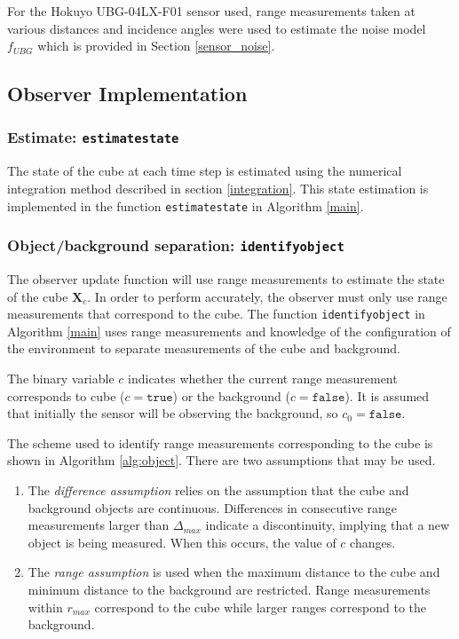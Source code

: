 	For the Hokuyo UBG-04LX-F01 sensor used, range measurements taken at various distances and incidence angles were used to estimate the noise model $f_{UBG}$ which is provided in Section \ref{sensor_noise}.
	
\subsection{Observer Implementation}

	\subsubsection{Estimate: \texttt{estimatestate}}
		The state of the cube at each time step is estimated using the numerical integration method described in section \ref{integration}. This state estimation is implemented in the function \texttt{estimatestate} in Algorithm \ref{main}.
	
	\subsubsection{Object/background separation: \texttt{identifyobject}} \label{separation}
		The observer update function will use range measurements to estimate the state of the cube $\mathbf{X}_c$. In order to perform accurately, the observer must only use range measurements that correspond to the cube. The function \texttt{identifyobject} in Algorithm \ref{main} uses range measurements and knowledge of the configuration of the environment to separate measurements of the cube and background.
		
		The binary variable $c$ indicates whether the current range measurement corresponds to cube ($c=\texttt{true}$) or the background ($c=\texttt{false}$). It is assumed that initially the sensor will be observing the background, so $c_0=\texttt{false}$.

		The scheme used to identify range measurements corresponding to the cube is shown in Algorithm \ref{alg:object}. There are two assumptions that may be used.
		\begin{enumerate}
		\item The \textit{difference assumption} relies on the assumption that the cube and background objects are continuous. Differences in consecutive range measurements larger than $\Delta_{max}$ indicate a discontinuity, implying that a new object is being measured. When this occurs, the value of $c$ changes.
		\item The \textit{range assumption} is used when the maximum distance to the cube and minimum distance to the background are restricted. Range measurements within $r_{max}$ correspond to the cube while larger ranges correspond to the background.
		\end{enumerate}
		
